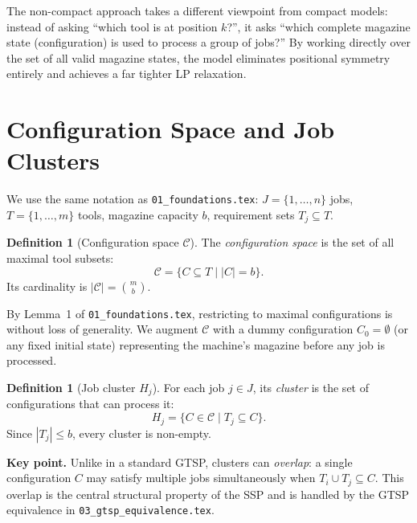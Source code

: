 \documentclass[11pt,a4paper]{article}
\theoremstyle{plain}
\theoremstyle{definition}
\newtheorem{definition}[theorem]{Definition}
\begin{document}
\medskip
The non-compact approach takes a different viewpoint from compact models: instead
of asking ``which tool is at position $k$?'', it asks ``which complete magazine
state (configuration) is used to process a group of jobs?'' By working directly
over the set of all valid magazine states, the model eliminates positional
symmetry entirely and achieves a far tighter LP relaxation.

\section{Configuration Space and Job Clusters}
\label{sec:config_space}

We use the same notation as \texttt{01\_foundations.tex}:
$J=\{1,\ldots,n\}$ jobs, $T=\{1,\ldots,m\}$ tools, magazine capacity $b$,
requirement sets $T_j \subseteq T$.

\begin{definition}[Configuration space $\mathcal{C}$]
The \emph{configuration space} is the set of all maximal tool subsets:
\[
  \mathcal{C} = \bigl\{ C \subseteq T \;\big|\; |C| = b \bigr\}.
\]
Its cardinality is $|\mathcal{C}| = \binom{m}{b}$.
\end{definition}

By Lemma~1 of \texttt{01\_foundations.tex}, restricting to maximal configurations
is without loss of generality. We augment $\mathcal{C}$ with a dummy configuration
$C_0 = \emptyset$ (or any fixed initial state) representing the machine's magazine
before any job is processed.

\begin{definition}[Job cluster $H_j$]
For each job $j \in J$, its \emph{cluster} is the set of configurations that
can process it:
\[
  H_j = \bigl\{ C \in \mathcal{C} \;\big|\; T_j \subseteq C \bigr\}.
\]
Since $|T_j| \le b$, every cluster is non-empty.
\end{definition}

\noindent\textbf{Key point.}
Unlike in a standard GTSP, clusters can \emph{overlap}: a single configuration
$C$ may satisfy multiple jobs simultaneously when $T_i \cup T_j \subseteq C$.
This overlap is the central structural property of the SSP and is handled by
the GTSP equivalence in \texttt{03\_gtsp\_equivalence.tex}.

\end{document}
